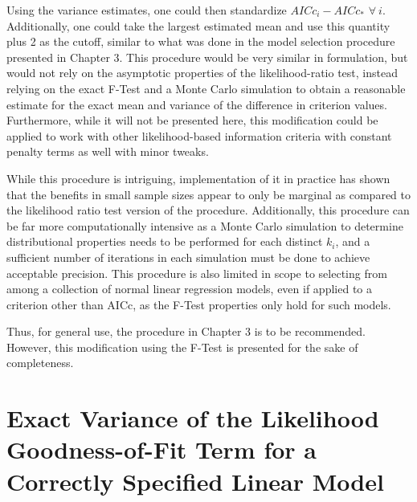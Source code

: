 Using the variance estimates, one could then standardize $AICc_i - AICc_*$ $\forall\: i$. Additionally, one could take the largest estimated
mean and use this quantity plus 2 as the cutoff, similar to what was done in the model selection procedure presented in Chapter 3. This
procedure would be very similar in formulation, but would not rely on the asymptotic properties of the likelihood-ratio test, instead
relying on the exact F-Test and a Monte Carlo simulation to obtain a reasonable estimate for the exact mean and variance of the difference
in criterion values. Furthermore, while it will not be presented here, this modification could be applied to work with other likelihood-based
information criteria with constant penalty terms as well with minor tweaks.

While this procedure is intriguing, implementation of it in practice has shown that the benefits in small sample sizes appear to only be
marginal as compared to the likelihood ratio test version of the procedure. Additionally, this procedure can be far more computationally
intensive as a Monte Carlo simulation to determine distributional properties needs to be performed for each distinct $k_i$, and a sufficient
number of iterations in each simulation must be done to achieve acceptable precision. This procedure is also limited in scope to selecting
from among a collection of normal linear regression models, even if applied to a criterion other than AICc, as the F-Test properties only hold
for such models.

Thus, for general use, the procedure in Chapter 3 is to be recommended. However, this modification using the F-Test is presented for the
sake of completeness.


\section*{Exact Variance of the Likelihood Goodness-of-Fit Term for a Correctly Specified Linear Model}

